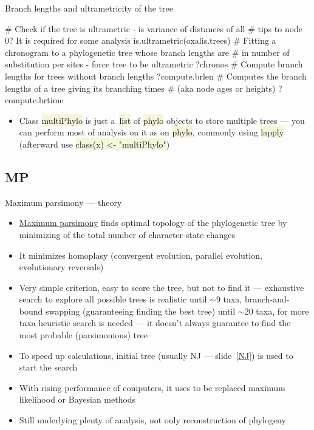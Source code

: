\documentclass[compress, xelatex, 11pt, xcolor=svgnames, aspectratio=169,
	hyperref={
		bookmarks=true,
		unicode=true,
		colorlinks=true,
		pdftitle={Molecular data in R},
		plainpages=false,
		pdfauthor={Vojtech Zeisek},
		pdfsubject={Course about phylogeny and evolution in R},
		pdfcreator={XeLaTeX},
		pdfkeywords={R, evolution, phylogeny, molecular data},
		linkcolor=Crimson, %
		anchorcolor=Magenta, %
		citecolor=Magenta, %
		filecolor=Magenta, %
		menucolor=Magenta, %
		urlcolor=DodgerBlue, %
		},
	url={hyphens, lowtilde} %
	]{beamer}
\renewcommand{\texttt}[1]{\colorbox{Beige}{{\ttfamily #1}}}
\begin{document}
\begin{frame}[fragile]{Branch lengths and ultrametricity of the tree}
	\begin{spluscode}
    # Check if the tree is ultrametric - is variance of distances of all
    # tips to node 0? It is required for some analysis
    is.ultrametric(oxalis.trees)
    # Fitting a chronogram to a phylogenetic tree whose branch lengths are
    # in number of substitution per sites - force tree to be ultrametric
    ?chronos
    # Compute branch lengths for trees without branch lengths
    ?compute.brlen
    # Computes the branch lengths of a tree giving its branching times
    # (aka node ages or heights)
    ?compute.brtime
	\end{spluscode}
	\begin{itemize}
		\item Class \texttt{multiPhylo} is just a~\texttt{list} of \texttt{phylo} objects to store multiple trees --- you can perform most of analysis on it as on \texttt{phylo}, commonly using \texttt{lapply} (afterward use \texttt{class(x) <- "multiPhylo"})
	\end{itemize}
\end{frame}

\subsection{MP}

\begin{frame}{Maximum parsimony --- theory}
	\label{MP}
	\begin{itemize}
		\item \href{https://en.wikipedia.org/wiki/Maximum_parsimony_(phylogenetics)}{Maximum parsimony} finds optimal topology of the phylogenetic tree by minimizing of the total number of character-state changes
		\item It minimizes homoplasy (convergent evolution, parallel evolution, evolutionary reversals)
		\item Very simple criterion, easy to score the tree, but not to find it --- exhaustive search to explore all possible trees is realistic until $\sim$9 taxa, branch-and-bound swapping (guaranteeing finding the best tree) until $\sim$20 taxa, for more taxa heuristic search is needed --- it doesn't always guarantee to find the most probable (parsimonious) tree
		\item To speed up calculations, initial tree (usually NJ --- slide~\ref{NJ}) is used to start the search
		\item With rising performance of computers, it uses to be replaced maximum likelihood or Bayesian methods
		\item Still underlying plenty of analysis, not only reconstruction of phylogeny
	\end{itemize}
\end{frame}
\end{document}
